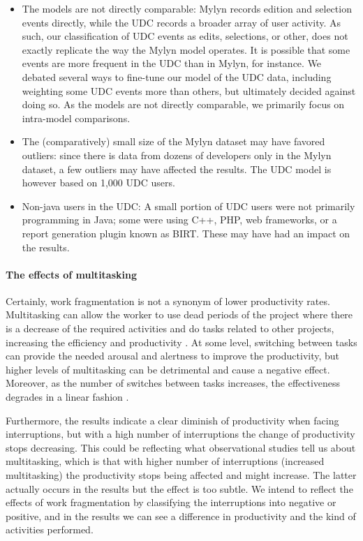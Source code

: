 \documentclass[times]{smrauth}
\begin{document}
\begin{itemize}
\item The models are not directly comparable: Mylyn records edition and selection events directly, while the UDC records a broader array of user activity. As such, our classification of UDC events as edits, selections, or other, does not exactly replicate the way the Mylyn model operates. It is possible that some events are more frequent in the UDC than in Mylyn, for instance. We debated several ways to fine-tune our model of the UDC data, including weighting some UDC events more than others, but ultimately decided against doing so. As the models are not directly comparable, we primarily focus on intra-model comparisons.
\item The (comparatively) small size of the Mylyn dataset may have favored outliers: since there is data from dozens of developers only in the Mylyn dataset, a few outliers may have affected the results. The UDC model is however based on 1,000 UDC users.
\item Non-java users in the UDC: A small portion of UDC users were not primarily programming in Java; some were using C++, PHP, web frameworks, or a report generation plugin known as BIRT. These may have had an impact on the results.
\end{itemize}

\paragraph{The effects of multitasking}
Certainly, work fragmentation is not a synonym of lower productivity rates. Multitasking can allow the worker to use dead periods of the project where there is a decrease of the required activities and do tasks related to other projects, increasing the efficiency and productivity \cite{ABV12}. At some level, switching between tasks can provide the needed arousal and alertness to improve the productivity, but higher levels of multitasking can be detrimental and cause a negative effect. Moreover, as the number of switches between tasks increases, the effectiveness degrades in a linear fashion \cite{AB12}. 

Furthermore, the results indicate a clear diminish of productivity when facing interruptions, but with a high number of interruptions the change of productivity stops decreasing. This could be reflecting what observational studies tell us about multitasking, which is that with higher number of interruptions (increased multitasking) the productivity stops being affected and might increase. The latter actually occurs in the results but the effect is too subtle. 
We intend to reflect the effects of work fragmentation by classifying the interruptions into negative or positive, and in the results we can see a difference in productivity and the kind of activities performed.
\end{document}
